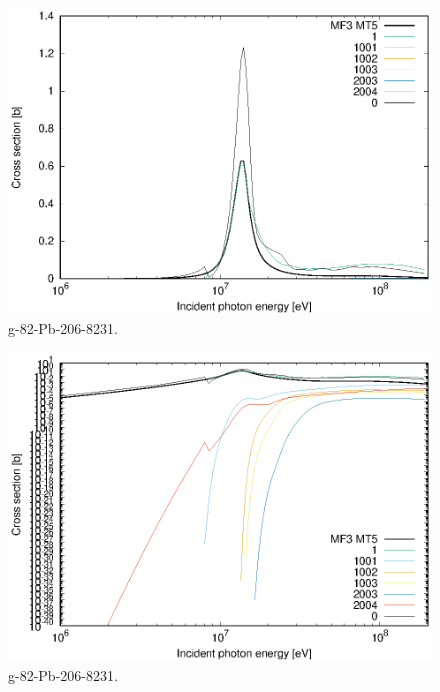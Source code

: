 \begin{figure}
 \includegraphics[width=\linewidth]{eps/g_82-Pb-206_8231.eps}
  \caption{g-82-Pb-206-8231.}
\end{figure}
\begin{figure}
 \includegraphics[width=\linewidth]{eps-log/g_82-Pb-206_8231.eps}
 \caption{g-82-Pb-206-8231.}
\end{figure}
\newpage \clearpage

